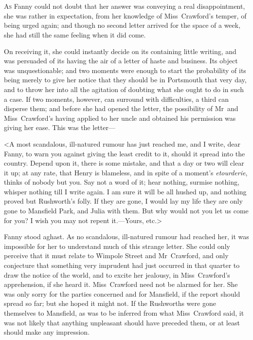 \chapter[Chapter \thechapter]{} 

 \lettrine[lraise=0.3]{A}{s} Fanny could not doubt that her answer was conveying a real disappointment, she was rather in expectation, from her knowledge of Miss~Crawford's temper, of being urged again; and though no second letter arrived for the space of a week, she had still the same feeling when it did come.

On receiving it, she could instantly decide on its containing little writing, and was persuaded of its having the air of a letter of haste and business. Its object was unquestionable; and two moments were enough to start the probability of its being merely to give her notice that they should be in Portsmouth that very day, and to throw her into all the agitation of doubting what she ought to do in such a case. If two moments, however, can surround with difficulties, a third can disperse them; and before she had opened the letter, the possibility of Mr~and Miss~Crawford's having applied to her uncle and obtained his permission was giving her ease. This was the letter—

<A most scandalous, ill-natured rumour has just reached me, and I write, dear Fanny, to warn you against giving the least credit to it, should it spread into the country. Depend upon it, there is some mistake, and that a day or two will clear it up; at any rate, that Henry is blameless, and in spite of a moment's \textit{etourderie}, thinks of nobody but you. Say not a word of it; hear nothing, surmise nothing, whisper nothing till I write again. I am sure it will be all hushed up, and nothing proved but Rushworth's folly. If they are gone, I would lay my life they are only gone to Mansfield Park, and Julia with them. But why would not you let us come for you? I wish you may not repent it.—Yours, etc.>

Fanny stood aghast. As no scandalous, ill-natured rumour had reached her, it was impossible for her to understand much of this strange letter. She could only perceive that it must relate to Wimpole Street and Mr~Crawford, and only conjecture that something very imprudent had just occurred in that quarter to draw the notice of the world, and to excite her jealousy, in Miss~Crawford's apprehension, if she heard it. Miss~Crawford need not be alarmed for her. She was only sorry for the parties concerned and for Mansfield, if the report should spread so far; but she hoped it might not. If the Rushworths were gone themselves to Mansfield, as was to be inferred from what Miss~Crawford said, it was not likely that anything unpleasant should have preceded them, or at least should make any impression.

